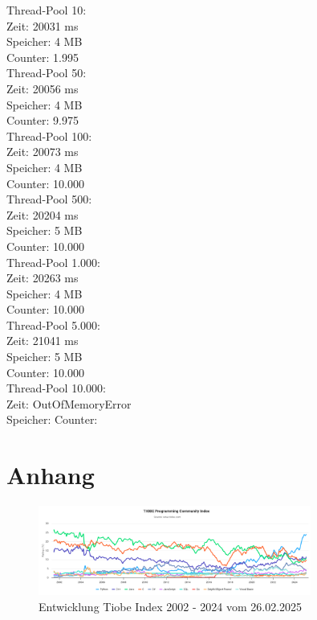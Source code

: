 \documentclass[11pt]{article}
\begin{document}
    Thread-Pool 10:\\
    Zeit: 20031 ms\\
    Speicher: 4 MB\\
    Counter: 1.995\\

    Thread-Pool 50:\\
    Zeit: 20056 ms\\
    Speicher: 4 MB\\
    Counter: 9.975\\

    Thread-Pool 100:\\
    Zeit: 20073 ms\\
    Speicher: 4 MB\\
    Counter: 10.000\\

    Thread-Pool 500:\\
    Zeit: 20204 ms\\
    Speicher: 5 MB\\
    Counter: 10.000\\

    Thread-Pool 1.000:\\
    Zeit: 20263 ms\\
    Speicher: 4 MB\\
    Counter: 10.000\\

    Thread-Pool 5.000:\\
    Zeit: 21041 ms\\
    Speicher: 5 MB\\
    Counter: 10.000\\

    Thread-Pool 10.000:\\
    Zeit: OutOfMemoryError\\
    Speicher:
    Counter:



    \printbibliography[
        heading=bibintoc,
        title={Literaturverzeichnis}
    ]
    \appendix


    \section{Anhang}

    \begin{figure}[h]
        \centering
        \includegraphics[width=0.8\textwidth]{pictures/Screenshot 2025-02-26 at 19-53-49 TIOBE Index - TIOBE}
        \caption{Entwicklung Tiobe Index 2002 - 2024 vom 26.02.2025 }
        \label{fig:entwicklung-tiobe}
    \end{figure}
\end{document}
